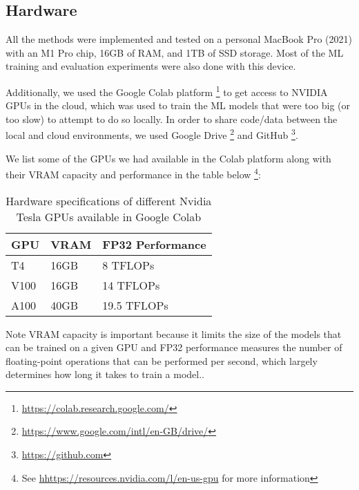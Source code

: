 \documentclass[../main.tex]{subfiles}
\begin{document}
    \vspace{-0.5cm}

    \subsection{Hardware}
    \vspace{-0.5cm}
    
    All the methods were implemented and tested on a personal MacBook Pro (2021) with an M1 Pro chip, 16GB of RAM, and 1TB of SSD storage. Most of the ML training and evaluation experiments were also done with this device. 
    
    Additionally, we used the Google Colab platform \footnote{\url{https://colab.research.google.com/}} to get access to NVIDIA GPUs in the cloud, which was used to train the ML models that were too big (or too slow) to attempt to do so locally. In order to share code/data between the local and cloud environments, we used Google Drive \footnote{\url{https://www.google.com/intl/en-GB/drive/}} and GitHub \footnote{\url{https://github.com}}. 
    
    We list some of the GPUs we had available in the Colab platform along with their VRAM capacity and performance in the table below \footnote{See \url{hhttps://resources.nvidia.com/l/en-us-gpu} for more information}:

    \begin{table}[h]
        \centering
        \begin{tabular}{l|l|l}
        \toprule
        \textbf{GPU} & \textbf{VRAM} & \textbf{FP32 Performance} \\
        \midrule
        T4 & 16GB & 8 TFLOPs \\
        V100 & 16GB & 14 TFLOPs \\
        A100 & 40GB & 19.5 TFLOPs \\
        \bottomrule
        \end{tabular}
        \caption{Hardware specifications of different Nvidia Tesla GPUs available in Google Colab}
        \label{table:tesla_models}
\end{table}

    \vspace{-0.3cm}

    Note VRAM capacity is important because it limits the size of the models that can be trained on a given GPU and FP32 performance measures the number of floating-point operations that can be performed per second, which largely determines how long it takes to train a model.. 
    
\end{document}
